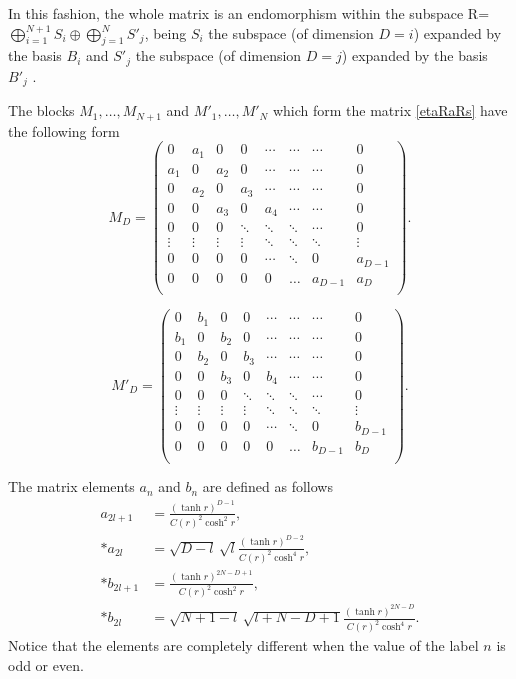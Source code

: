 In this fashion, the whole matrix is an endomorphism within the subspace R=$\bigoplus_{i=1}^{N+1} S_{i}\oplus\bigoplus_{j=1}^N S'_j$, being $S_{i}$ the subspace (of dimension $D=i$) expanded by the basis $B_{i}$ and $S'_j$ the subspace (of dimension $D=j$) expanded by the basis $B'_j$ .

The blocks $M_1,\dots,M_{N+1}$ and $M'_1,\dots,M'_{N}$ which form the matrix \eqref{etaRaRs} have the following form
\begin{equation}\label{blockss}
M_D=\left(\!
\begin{array}{cccccccc}
0  & a_1  & 0 & 0 & \cdots & \cdots& \cdots& 0 \\
a_1 & 0 & a_2 & 0 & \cdots & \cdots& \cdots & 0\\
0 & a_2 & 0 & a_3 & \cdots & \cdots& \cdots& 0\\
0 & 0 & a_3 &0 & a_4 & \cdots& \cdots& 0\\
0 & 0 & 0 &  \ddots &\ddots &  \ddots &\cdots& 0\\
\vdots  & \vdots  & \vdots  & \vdots  & \ddots  & \ddots  & \ddots  & \vdots \\
0 & 0 & 0 &  0 &\cdots&  \ddots &0& a_{D-1}\\
0 & 0 & 0 &  0 &0&  \dots &a_{D-1}& a_{D}\\
\end{array}\!\right).
\end{equation}

\begin{equation}
M'_D=\left(\!
\begin{array}{cccccccc}
0  & b_{1}  & 0 & 0 & \cdots & \cdots& \cdots& 0 \\
b_{1} & 0 & b_{2} & 0 & \cdots & \cdots& \cdots & 0\\
0 & b_{2} & 0 & b_{3} & \cdots & \cdots& \cdots& 0\\
0 & 0 & b_{3} &0 & b_{4} & \cdots& \cdots& 0\\
0 & 0 & 0 &  \ddots &\ddots &  \ddots &\cdots& 0\\
\vdots  & \vdots  & \vdots  & \vdots  & \ddots  & \ddots  & \ddots  & \vdots \\
0 & 0 & 0 &  0 &\cdots&  \ddots &0& b_{D-1}\\
0 & 0 & 0 &  0 &0&  \dots &b_{D-1}& b_{D}\\
\end{array}\!\right).
\end{equation}

The matrix elements $a_n$ and $b_n$ are defined as follows
\begin{align}
\nonumber a_{2l+1}&=\frac{(\tanh r)^{D-1}}{C(r)^2\cosh^2 r},\\*
\nonumber a_{2l}&=\sqrt{D-l}\,\sqrt{l}\frac{(\tanh r)^{D-2}}{C(r)^2\cosh^4r},\\*
\nonumber b_{2l+1}&=\frac{(\tanh r)^{2N-D+1}}{C(r)^2\cosh^2 r},\\*
 b_{2l}&=\sqrt{N+1-l}\,\sqrt{l+N-D+1}\frac{(\tanh r)^{2N-D}}{C(r)^2\cosh^4r}.
\end{align}
Notice that the elements are completely different when the value of the label $n$ is odd or even.

